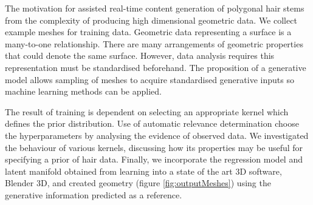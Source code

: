 \documentclass[ %
author={Dillon Keith Diep},
supervisor={Dr. Carl Henrik Ek},
degree={MEng},
title={ART-CG Hair:},
subtitle={Assisted Real-time Content Generation of Stylised Virtual Hair},
type={Research},
year={2017} ]{dissertation}
\begin{document}
	The motivation for assisted real-time content generation of polygonal hair stems from the complexity of producing high dimensional geometric data. We collect example meshes for training data. Geometric data representing a surface is a many-to-one relationship. There are many arrangements of geometric properties that could denote the same surface. However, data analysis requires this representation must be standardised beforehand. The proposition of a generative model allows sampling of meshes to acquire standardised generative inputs so machine learning methods can be applied.
	
	The result of training is dependent on selecting an appropriate kernel which defines the prior distribution. Use of automatic relevance determination choose the hyperparameters by analysing the evidence of observed data. We investigated the behaviour of various kernels, discussing how its properties may be useful for specifying a prior of hair data. Finally, we incorporate the regression model and latent manifold obtained from learning into a state of the art 3D software, Blender 3D, and created geometry (figure \ref{fig:outputMeshes}) using the generative information predicted as a reference.
	
\end{document}
